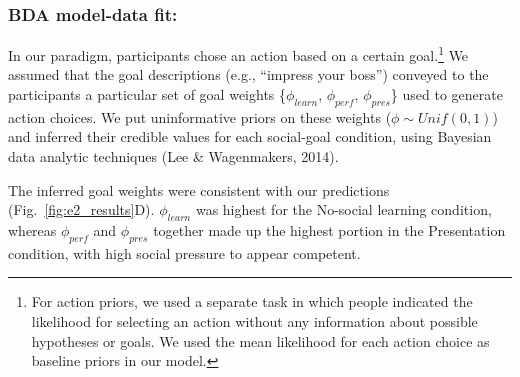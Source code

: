 \documentclass[10pt, letterpaper]{article}
\begin{document}
\subsubsection{BDA model-data fit:}\label{bda-model-data-fit}

In our paradigm, participants chose an action based on a certain
goal.\footnote{For action priors, we used a separate task in which people indicated the likelihood for selecting an action without any information about possible hypotheses or goals. We used the mean likelihood for each action choice as baseline priors in our model.}
We assumed that the goal descriptions (e.g., ``impress your boss'')
conveyed to the participants a particular set of goal weights
\{\(\phi_{learn}\), \(\phi_{perf}\), \(\phi_{pres}\)\} used to generate
action choices. We put uninformative priors on these weights
(\(\phi \sim Unif(0,1)\)) and inferred their credible values for each
social-goal condition, using Bayesian data analytic techniques (Lee \&
Wagenmakers, 2014).

The inferred goal weights were consistent with our predictions
(Fig.~\ref{fig:e2_results}D). \(\phi_{learn}\) was highest for the
No-social learning condition, whereas \(\phi_{perf}\) and
\(\phi_{pres}\) together made up the highest portion in the Presentation
condition, with high social pressure to appear competent.
\end{document}
